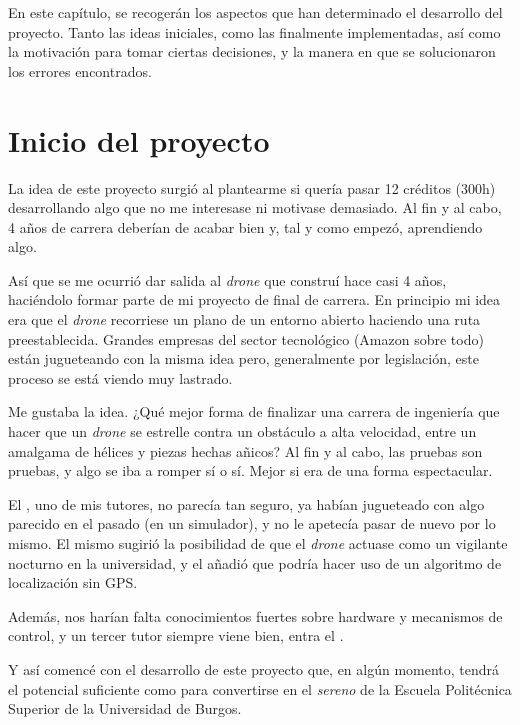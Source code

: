 \label{cap:RelvAsp}
En este capítulo, se recogerán los aspectos que han determinado el desarrollo del proyecto. Tanto las ideas iniciales, como las finalmente implementadas, así como la motivación para tomar ciertas decisiones, y la manera en que se solucionaron los errores encontrados. 

\section{Inicio del proyecto}

La idea de este proyecto surgió al plantearme si quería pasar 12 créditos (300h) desarrollando algo que no me interesase ni motivase demasiado. Al fin y al cabo, 4 años de carrera deberían de acabar bien y, tal y como empezó, aprendiendo algo.

Así que se me ocurrió dar salida al \emph{drone} que construí hace casi 4 años, haciéndolo formar parte de mi proyecto de final de carrera. En principio mi idea era que el \emph{drone} recorriese un plano de un entorno abierto haciendo una ruta preestablecida. Grandes empresas del sector tecnológico (Amazon sobre todo) están jugueteando con la misma idea pero, generalmente por legislación, este proceso se está viendo muy lastrado. 

Me gustaba la idea. ¿Qué mejor forma de finalizar una carrera de ingeniería que hacer que un \emph{drone} se estrelle contra un obstáculo a alta velocidad, entre un amalgama de hélices y piezas hechas añicos? Al fin y al cabo, las pruebas son pruebas, y algo se iba  a romper sí o sí. Mejor si era de una forma espectacular.

El \cotutorOne{}, uno de mis tutores, no parecía tan seguro, ya habían jugueteado con algo parecido en el pasado (en un simulador), y no le apetecía pasar de nuevo por lo mismo. El mismo \cotutorOne{} sugirió la posibilidad de que el \emph{drone} actuase como un vigilante nocturno en la universidad, y el \cotutorTwo{} añadió que podría  hacer uso de un algoritmo de localización sin GPS. 

Además, nos harían falta conocimientos fuertes sobre hardware y mecanismos de control, y un tercer tutor siempre viene bien, entra el \tutor{}.

Y así comencé con el desarrollo de este proyecto que, en algún momento, tendrá el potencial suficiente como para convertirse en el \emph{sereno} de la Escuela Politécnica Superior de la Universidad de Burgos.

